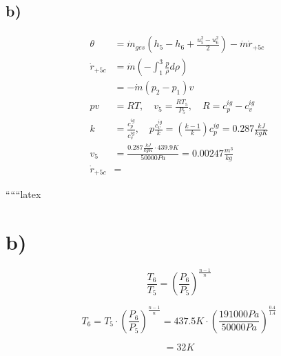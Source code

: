 

\subsection*{b)}

\begin{align*}
\theta &= \dot{m}_{ges} \left( h_5 - h_6 + \frac{u_5^2 - u_6^2}{2} \right) - \dot{m} \dot{r}_{+5c} \\
\dot{r}_{+5c} &= \dot{m} \left( - \int_{1}^{3} \frac{p}{\rho} d\rho \right) \\
&= - \dot{m} \left( p_2 - p_1 \right) v \\
pv &= RT, \quad v_5 = \frac{R T_5}{P_5}, \quad R = c_p^{ig} - c_v^{ig} \\
k &= \frac{c_p^{ig}}{c_v^{ig}}, \quad p \frac{c_v^{ig}}{k} = \left( \frac{k - 1}{k} \right) c_p^{ig} = 0.287 \frac{kJ}{kgK} \\
v_5 &= \frac{0.287 \frac{kJ}{kgK} \cdot 439.9 K}{50000 Pa} = 0.00247 \frac{m^3}{kg} \\
\dot{r}_{+5c} &= 
\end{align*}

``````latex



\section*{b)}

\[
\frac{T_6}{T_5} = \left( \frac{P_6}{P_5} \right)^{\frac{n-1}{n}}
\]

\[
T_6 = T_5 \cdot \left( \frac{P_6}{P_5} \right)^{\frac{n-1}{n}} = 437.5K \cdot \left( \frac{191000Pa}{50000Pa} \right)^{\frac{0.4}{1.4}}
\]

\[
= 32K
\]